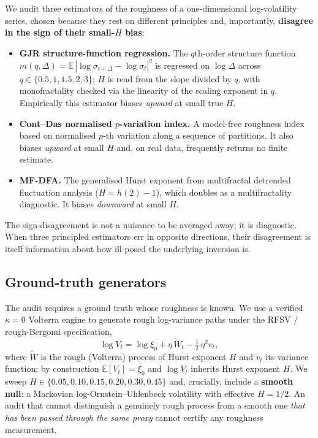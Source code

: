 \documentclass[11pt]{article}
\begin{document}
We audit three estimators of the roughness of a one-dimensional log-volatility
series, chosen because they rest on different principles and, importantly,
\textbf{disagree in the sign of their small-$H$ bias}:
\begin{itemize}
\item \textbf{GJR structure-function regression.} The $q$th-order structure
function $m(q, \Delta) = \mathbb{E}\,|\log \sigma_{t+\Delta} - \log \sigma_t|^q$ is
regressed on $\log \Delta$ across $q \in \{0.5, 1, 1.5, 2, 3\}$; $H$ is read from
the slope divided by $q$, with monofractality checked via the linearity of the
scaling exponent in $q$. Empirically this estimator biases \emph{upward} at small
true $H$.
\item \textbf{Cont--Das normalised $p$-variation index.} A model-free roughness
index based on normalised $p$-th variation along a sequence of partitions. It also
biases \emph{upward} at small $H$ and, on real data, frequently returns no finite
estimate.
\item \textbf{MF-DFA.} The generalised Hurst exponent from multifractal detrended
fluctuation analysis ($H = h(2) - 1$), which doubles as a multifractality
diagnostic. It biases \emph{downward} at small $H$.
\end{itemize}

The sign-disagreement is not a nuisance to be averaged away; it is diagnostic. When
three principled estimators err in opposite directions, their disagreement is itself
information about how ill-posed the underlying inversion is.

\subsection{Ground-truth generators}

The audit requires a ground truth whose roughness is known. We use a verified
$\kappa = 0$ Volterra engine to generate rough log-variance paths under the RFSV /
rough-Bergomi specification,
\[
  \log V_t = \log \xi_0 + \eta\, \widetilde{W}_t - \tfrac{1}{2}\,\eta^2 v_t,
\]
where $\widetilde{W}$ is the rough (Volterra) process of Hurst exponent $H$ and
$v_t$ its variance function; by construction $\mathbb{E}[V_t] = \xi_0$ and
$\log V_t$ inherits Hurst exponent $H$. We sweep
$H \in \{0.05, 0.10, 0.15, 0.20, 0.30, 0.45\}$ and, crucially, include a
\textbf{smooth null}: a Markovian log-Ornstein--Uhlenbeck volatility with effective
$H = 1/2$. An audit that cannot distinguish a genuinely rough process from a smooth
one \emph{that has been passed through the same proxy} cannot certify any roughness
measurement.
\end{document}

